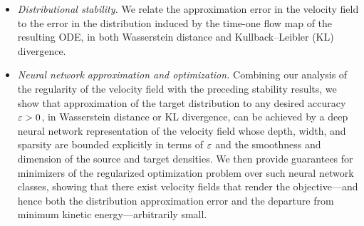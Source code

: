 \begin{itemize}

\item \textit{Distributional stability.} We relate the approximation error in the velocity field to the error in the distribution induced by the time-one flow map of the resulting ODE, in both Wasserstein distance and Kullback--Leibler (KL) divergence.

\item \textit{Neural network approximation and optimization.} Combining our analysis of the regularity of the velocity field with the preceding stability results, we show that approximation of the target distribution to any desired accuracy $\varepsilon > 0$, in Wasserstein distance or KL divergence, can be achieved by a deep neural network representation of the velocity field whose depth, width, and sparsity are bounded explicitly in terms of $\varepsilon$ and 
the smoothness and dimension of the source and target densities.
%
We then provide guarantees for minimizers of the regularized optimization problem over such neural network classes, showing that there exist velocity fields that render the objective---and hence both the distribution approximation error and the departure from minimum kinetic energy---arbitrarily small.


\end{itemize}

